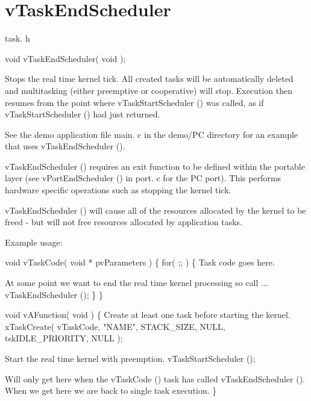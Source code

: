 \hypertarget{group__v_task_end_scheduler}{\section{v\-Task\-End\-Scheduler}
\label{group__v_task_end_scheduler}
}
task. h 
\begin{DoxyPre}void vTaskEndScheduler( void );\end{DoxyPre}


Stops the real time kernel tick. All created tasks will be automatically deleted and multitasking (either preemptive or cooperative) will stop. Execution then resumes from the point where v\-Task\-Start\-Scheduler () was called, as if v\-Task\-Start\-Scheduler () had just returned.

See the demo application file main. c in the demo/\-P\-C directory for an example that uses v\-Task\-End\-Scheduler ().

v\-Task\-End\-Scheduler () requires an exit function to be defined within the portable layer (see v\-Port\-End\-Scheduler () in port. c for the P\-C port). This performs hardware specific operations such as stopping the kernel tick.

v\-Task\-End\-Scheduler () will cause all of the resources allocated by the kernel to be freed -\/ but will not free resources allocated by application tasks.

Example usage\-: 
\begin{DoxyPre}
 void vTaskCode( void * pvParameters )
 \{
         for( ;; )
         \{
Task code goes here.\end{DoxyPre}



\begin{DoxyPre}At some point we want to end the real time kernel processing
so call ...
                 vTaskEndScheduler ();
         \}
 \}\end{DoxyPre}



\begin{DoxyPre} void vAFunction( void )
 \{
Create at least one task before starting the kernel.
         xTaskCreate( vTaskCode, "NAME", STACK\_SIZE, NULL, tskIDLE\_PRIORITY, NULL );\end{DoxyPre}



\begin{DoxyPre}Start the real time kernel with preemption.
         vTaskStartScheduler ();\end{DoxyPre}



\begin{DoxyPre}Will only get here when the vTaskCode () task has called
vTaskEndScheduler ().  When we get here we are back to single task
execution.
 \}
   \end{DoxyPre}
 
